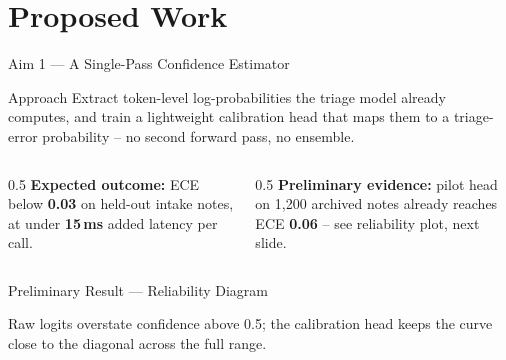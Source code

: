 \section{Proposed Work}

\begin{frame}{Aim 1 --- A Single-Pass Confidence Estimator}
  \begin{navybox}{Approach}
    Extract token-level log-probabilities the triage model already
    computes, and train a lightweight calibration head that maps them to
    a triage-error probability -- no second forward pass, no ensemble.
  \end{navybox}
  \par\vspace{6pt}
  \begin{columns}[T]
    \begin{column}{0.5\textwidth}
      \small
      \textbf{Expected outcome:} ECE below \textbf{0.03} on held-out
      intake notes, at under \textbf{15\,ms} added latency per call.
    \end{column}
    \begin{column}{0.5\textwidth}
      \small
      \textbf{Preliminary evidence:} pilot head on 1{,}200 archived notes
      already reaches ECE \textbf{0.06} -- see reliability plot, next
      slide.
    \end{column}
  \end{columns}
\end{frame}

\begin{frame}{Preliminary Result --- Reliability Diagram}
  \begin{center}
  \end{center}
  \footnotesize\color{slate}
  Raw logits overstate confidence above 0.5; the calibration head keeps
  the curve close to the diagonal across the full range.
\end{frame}

